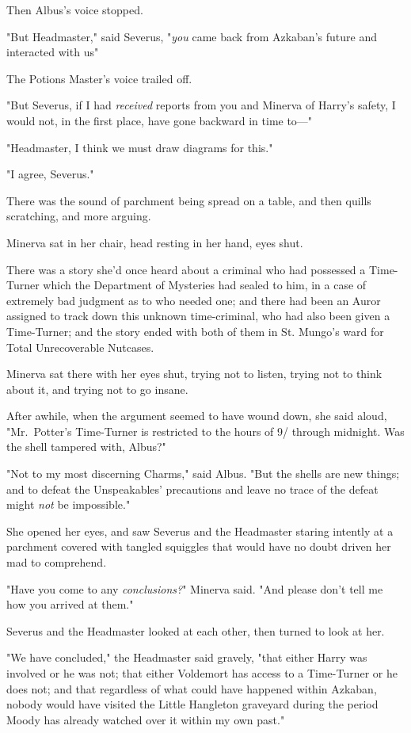 Then Albus's voice stopped.

"But Headmaster," said Severus, "\emph{you} came back from Azkaban's future and
interacted with us{\el}"

The Potions Master's voice trailed off.

"But Severus, if I had \emph{received} reports from you and Minerva of Harry's
safety, I would not, in the first place, have gone backward in time to\mbox{---}"

"Headmaster, I think we must draw diagrams for this."

"I agree, Severus."

There was the sound of parchment being spread on a table, and then quills
scratching, and more arguing.

Minerva sat in her chair, head resting in her hand, eyes shut.

There was a story she'd once heard about a criminal who had possessed a
Time-Turner which the Department of Mysteries had sealed to him, in a case of
extremely bad judgment as to who needed one; and there had been an Auror
assigned to track down this unknown time-criminal, who had also been given a
Time-Turner; and the story ended with both of them in St. Mungo's ward for
Total Unrecoverable Nutcases.

Minerva sat there with her eyes shut, trying not to listen, trying not to think
about it, and trying not to go insane.

After awhile, when the argument seemed to have wound down, she said aloud,
"Mr.~Potter's Time-Turner is restricted to the hours of 9\PM/ through
midnight. Was the shell tampered with, Albus?"

"Not to my most discerning Charms," said Albus. "But the shells are new things;
and to defeat the Unspeakables' precautions and leave no trace of the
defeat{\el} might \emph{not} be impossible."

She opened her eyes, and saw Severus and the Headmaster staring intently at a
parchment covered with tangled squiggles that would have no doubt driven her
mad to comprehend.

"Have you come to any \emph{conclusions?}" Minerva said. "And please don't tell
me how you arrived at them."

Severus and the Headmaster looked at each other, then turned to look at her.

"We have concluded," the Headmaster said gravely, "that either Harry was
involved or he was not; that either Voldemort has access to a Time-Turner or he
does not; and that regardless of what could have happened within Azkaban,
nobody would have visited the Little Hangleton graveyard during the period
Moody has already watched over it within my own past."


